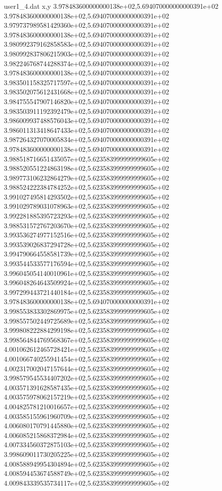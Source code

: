 \begin{filecontents}{user1_4.dat}
x,y
3.978483600000000138e+02,5.694070000000000391e+02
3.978483600000000138e+02,5.694070000000000391e+02
3.979737989581429360e+02,5.694070000000000391e+02
3.978483600000000138e+02,5.694070000000000391e+02
3.980992379162858583e+02,5.694070000000000391e+02
3.980992837806215903e+02,5.694070000000000391e+02
3.982246768744288374e+02,5.694070000000000391e+02
3.978483600000000138e+02,5.694070000000000391e+02
3.983501158325717597e+02,5.694070000000000391e+02
3.983502075612431668e+02,5.694070000000000391e+02
3.984755547907146820e+02,5.694070000000000391e+02
3.983503911192392479e+02,5.694070000000000391e+02
3.986009937488576043e+02,5.694070000000000391e+02
3.986011313418647433e+02,5.694070000000000391e+02
3.987264327070005834e+02,5.694070000000000391e+02
3.978483600000000138e+02,5.694070000000000391e+02
3.988518716651435057e+02,5.623583999999999605e+02
3.988520551224863198e+02,5.623583999999999605e+02
3.989773106232864279e+02,5.623583999999999605e+02
3.988524222384784252e+02,5.623583999999999605e+02
3.991027495814293502e+02,5.623583999999999605e+02
3.991029789031078963e+02,5.623583999999999605e+02
3.992281885395723293e+02,5.623583999999999605e+02
3.988531572767203670e+02,5.623583999999999605e+02
3.993536274977152516e+02,5.623583999999999605e+02
3.993539026837294728e+02,5.623583999999999605e+02
3.994790664558581739e+02,5.623583999999999605e+02
3.993544533577176594e+02,5.623583999999999605e+02
3.996045054140010961e+02,5.623583999999999605e+02
3.996048264643509924e+02,5.623583999999999605e+02
3.997299443721440184e+02,5.623583999999999605e+02
3.978483600000000138e+02,5.694070000000000391e+02
3.998553833302869975e+02,5.623583999999999605e+02
3.998557502449725689e+02,5.623583999999999605e+02
3.999808222884299198e+02,5.623583999999999605e+02
3.998564844769568367e+02,5.623583999999999605e+02
4.001062612465728421e+02,5.623583999999999605e+02
4.001066740255941454e+02,5.623583999999999605e+02
4.002317002047157644e+02,5.623583999999999605e+02
3.998579545534407202e+02,5.623583999999999605e+02
4.003571391628587435e+02,5.623583999999999605e+02
4.003575978062157219e+02,5.623583999999999605e+02
4.004825781210016657e+02,5.623583999999999605e+02
4.003585155961960709e+02,5.623583999999999605e+02
4.006080170791445880e+02,5.623583999999999605e+02
4.006085215868372984e+02,5.623583999999999605e+02
4.007334560372875103e+02,5.623583999999999605e+02
3.998609011730205225e+02,5.623583999999999605e+02
4.008588949954304894e+02,5.623583999999999605e+02
4.008594453674588749e+02,5.623583999999999605e+02
4.009843339535734117e+02,5.623583999999999605e+02

\end{filecontents}
